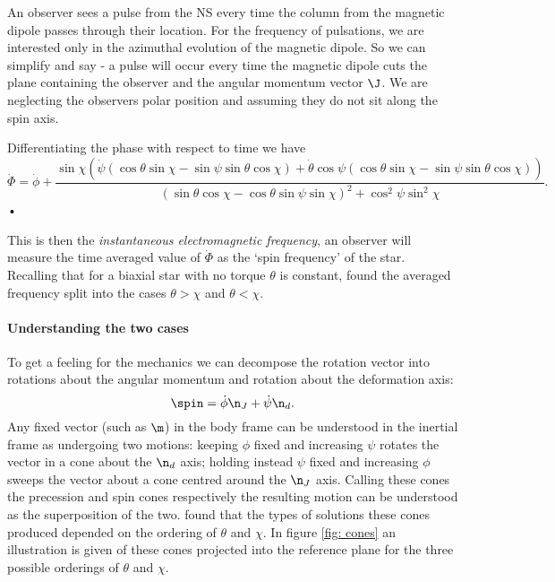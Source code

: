 \documentclass[/home/greg/Thesis/main/main.tex]{subfiles}
\begin{document}
An observer sees a pulse from the NS every time the column from the magnetic
dipole passes through their location. For the frequency of pulsations, we are
interested only in the azimuthal evolution of the magnetic dipole. So we can 
simplify and say - a pulse
will occur every time the magnetic dipole cuts the plane containing the observer
and the angular momentum vector $\J$. We are neglecting the observers polar
position and assuming they do not sit along the spin axis.

Differentiating the phase with respect to time we have
\begin{equation}
\dot{\Phi} = \dot{\phi} 
+ \frac{\sin\chi \left(
\dot{\psi} (\cos\theta\sin\chi - \sin \psi \sin \theta \cos\chi) + 
\dot{\theta} \cos\psi (\cos\theta\sin\chi - \sin \psi \sin \theta \cos\chi)\right) 
}{(\sin\theta \cos \chi - \cos \theta \sin \psi \sin \chi)^{2} + \cos^{2}\psi \sin^{2} \chi}.
\label{eqn: Phi_dot}
\end{equation}•

This is then the \emph{instantaneous electromagnetic frequency}, an observer
will measure the time averaged value of $\dot{\Phi}$ as the `spin frequency' of
the star. Recalling that for a biaxial star with no torque $\theta$ is constant,
\citet{Jones2001} found the averaged frequency split into the cases 
$\theta > \chi$ and $\theta < \chi$.

\paragraph{Understanding the two cases}
To get a feeling for the mechanics we can decompose the rotation vector into 
rotations about the angular momentum and rotation about the deformation axis:
\begin{equation}
  \spin = \dot{\phi}\n_{J} + \dot{\psi}\n_{d}.
\label{eqn: decomp}
\end{equation}
Any fixed vector (such as $\m$) in the body frame can be understood in the
inertial frame as undergoing two motions: keeping $\phi$ fixed and increasing
$\psi$ rotates the vector in a cone about the $\n_{d}$ axis; holding instead
$\psi$ fixed and increasing $\phi$ sweeps the vector about a cone centred
around the $\n_{J}$ axis. Calling these cones the precession and spin cones
respectively the resulting motion can be understood as the superposition of the
two.  found that the types of solutions these cones produced
depended on the ordering of $\theta$ and $\chi$. In figure \ref{fig: cones} an 
illustration is given of these cones
projected into the reference plane for the three possible orderings of $\theta$
and $\chi$. 
\end{document}
